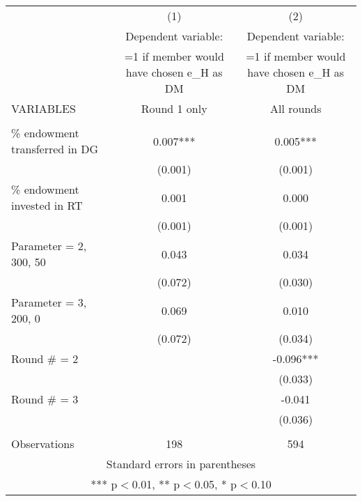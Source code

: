 \documentclass[]{article}
\begin{document}
\begin{tabular}{lcc} \hline
 & (1) & (2) \\
 & Dependent variable: & Dependent variable: \\
 & =1 if member would have chosen e\_H as DM & =1 if member would have chosen e\_H as DM \\
VARIABLES & Round 1 only & All rounds \\ \hline
 &  &  \\
\% endowment transferred in DG & 0.007*** & 0.005*** \\
 & (0.001) & (0.001) \\
\% endowment invested in RT & 0.001 & 0.000 \\
 & (0.001) & (0.001) \\
Parameter = 2, 300, 50 & 0.043 & 0.034 \\
 & (0.072) & (0.030) \\
Parameter = 3, 200, 0 & 0.069 & 0.010 \\
 & (0.072) & (0.034) \\
Round \# = 2 &  & -0.096*** \\
 &  & (0.033) \\
Round \# = 3 &  & -0.041 \\
 &  & (0.036) \\
 &  &  \\
 Observations & 198 & 594 \\ \hline
\multicolumn{3}{c}{ Standard errors in parentheses} \\
\multicolumn{3}{c}{ *** p$<$0.01, ** p$<$0.05, * p$<$0.10} \\
\end{tabular}
\end{document}
